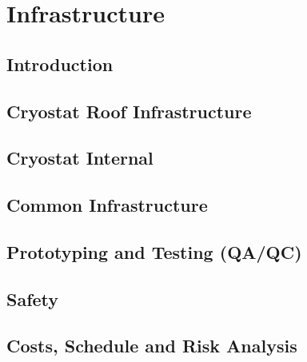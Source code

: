\section{Infrastructure}
\label{sec:fdsp-tc-infr}


\subsection{Introduction}
\label{sec:fdsp-tc-infr-intro}




\subsection{Cryostat Roof Infrastructure}
\label{sec:fdsp-tc-infr-cryo-roof}

\subsection{Cryostat Internal}
\label{sec:fdsp-tc-infr-cryo-int}


\subsection{Common Infrastructure}
\label{sec:fdsp-tc-infr-comm}


\subsection{Prototyping and Testing (QA/QC)}
\label{sec:fdsp-tc-infr-qaqc}


\subsection{Safety}
\label{sec:fdsp-tc-infr-safety}


\subsection{Costs, Schedule and Risk Analysis}
\label{sec:fdsp-tc-infr-cost}

